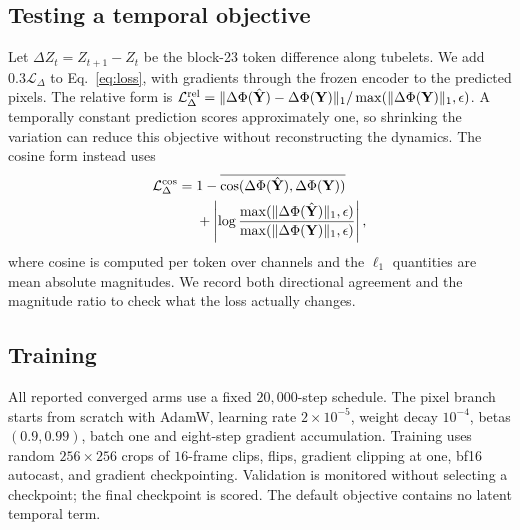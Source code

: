 \subsection{Testing a temporal objective}\label{sec:method:temporal}

Let $\Delta Z_t=Z_{t+1}-Z_t$ be the block-23 token difference along tubelets.
We add $0.3\mathcal L_{\Delta}$ to Eq.~\eqref{eq:loss}, with gradients through
the frozen encoder to the predicted pixels.
The relative form is
$\mathcal L_{\Delta}^{\mathrm{rel}}=
\|\Delta\Phi(\hat{\mathbf{Y}})-\Delta\Phi(\mathbf{Y})\|_1/
\max(\|\Delta\Phi(\mathbf{Y})\|_1,\epsilon)$.
A temporally constant prediction scores approximately one, so shrinking the
variation can reduce this objective without reconstructing the dynamics.
The cosine form instead uses
\begin{equation}\label{eq:tdcos}
\begin{aligned}
\mathcal L_{\Delta}^{\mathrm{cos}}={}&
1-\overline{\cos(\Delta\Phi(\hat{\mathbf{Y}}),\Delta\Phi(\mathbf{Y}))}\\
&+\left|\log \frac{\max(\|\Delta\Phi(\hat{\mathbf{Y}})\|_1,\epsilon)}
                       {\max(\|\Delta\Phi(\mathbf{Y})\|_1,\epsilon)}\right|,
\end{aligned}
\end{equation}
where cosine is computed per token over channels and the $\ell_1$ quantities
are mean absolute magnitudes. We record both directional
agreement and the magnitude ratio to check what the loss actually changes.

\subsection{Training}\label{sec:method:train}

All reported converged arms use a fixed $20{,}000$-step schedule.
The pixel branch starts from scratch with AdamW, learning rate
$2\times10^{-5}$, weight decay $10^{-4}$, betas $(0.9,0.99)$,
batch one and eight-step gradient accumulation.
Training uses random $256\times256$ crops of $16$-frame clips, flips,
gradient clipping at one, bf16 autocast, and gradient checkpointing.
Validation is monitored without selecting a checkpoint; the final checkpoint
is scored. The default objective contains no latent temporal term.
